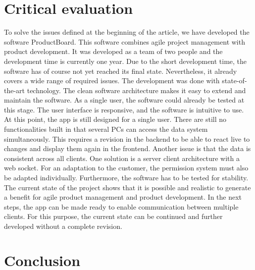 \section{Critical evaluation}
\label{sec:evaluation}
To solve the issues defined at the beginning of the article, we have developed the software ProductBoard. This software combines agile project management with product development. It was developed as a team of two people and the development time is currently one year. Due to the short development time, the software has of course not yet reached its final state. Nevertheless, it already covers a wide range of required issues. The development was done with state-of-the-art technology. The clean software architecture makes it easy to extend and maintain the software. As a single user, the software could already be tested at this stage. The user interface is responsive, and the software is intuitive to use. At this point, the app is still designed for a single user. There are still no functionalities built in that several PCs can access the data system simultaneously. This requires a revision in the backend to be able to react live to changes and display them again in the frontend. Another issue is that the data is consistent across all clients. One solution is a server client architecture with a web socket. For an adaptation to the customer, the permission system must also be adapted individually. Furthermore, the software has to be tested for stability. The current state of the project shows that it is possible and realistic to generate a benefit for agile product management and product development. In the next steps, the app can be made ready to enable communication between multiple clients. For this purpose, the current state can be continued and further developed without a complete revision. 

\section{Conclusion}
\label{sec:conclusion}

